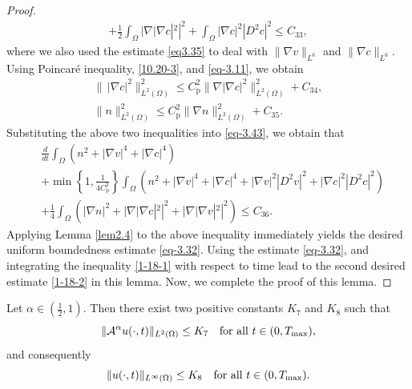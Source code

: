 \documentclass[reqno]{amsart}
\begin{document}
\begin{proof}
\begin{equation}
\begin{aligned}
+ \frac{1}{2}\int_{\Omega} |\nabla |\nabla c|^2|^2
+ \int_{\Omega} |\nabla c|^2 |D^2 c|^2 \leq C_{33},
\end{aligned}
\end{equation}
where we also used the estimate \eqref{eq3.35} to deal with $\|\nabla v\|_{L^6}$ and 
$\|\nabla c\|_{L^6}$.
Using Poincar\'e inequality, \eqref{10.20-3}, and \eqref{eq-3.11}, we obtain
\begin{gather*}
\|\, |\nabla c|^2 \|_{L^2(\Omega)}^2 
\leq C^2_\mathrm{p} \| \nabla|\nabla c|^2 \|_{L^2(\Omega)}^2 +C_{34}, \\
\| n \|_{L^2(\Omega)}^2 \leq C^2_\mathrm{p} \| \nabla n \|_{L^2(\Omega)}^2 +C_{35}.
\end{gather*}
Substituting the above two inequalities into \eqref{eq-3.43}, we obtain that
\begin{equation}\label{1-18-1}
\begin{aligned}
&\frac{d}{dt} \int_{\Omega} \left( n^2 + |\nabla v|^4 + |\nabla c|^4\right)
\\
&+ \min\left\{1,\frac{1}{4C^2_\mathrm{p}} \right\} \int_{\Omega} \left( n^2
 + |\nabla v|^4 + |\nabla c|^4 + |\nabla v|^2 |D^2 v|^2
 + |\nabla c|^2 |D^2 c|^2\right)\\
&+\frac{1}{4}\int_{\Omega}\left(|\nabla n|^2+|\nabla |\nabla c|^2|^2
 +|\nabla |\nabla v|^2|^2\right)\leq C_{36}.
\end{aligned}
\end{equation}
Applying Lemma \ref{lem2.4} to the above inequality immediately yields the desired 
uniform boundedness estimate \eqref{eq-3.32}.
Using the estimate \eqref{eq-3.32}, and  integrating the inequality \eqref{1-18-1} 
with respect to time  lead to the second desired estimate \eqref{1-18-2} in this lemma.
Now, we complete the proof of this lemma.
\end{proof}

\begin{lemma}\label{lem3.7}
Let $ \alpha \in (\frac{1}{2}, 1) $. Then there exist two positive constants $K_7$ 
and $K_8$ such that
\begin{equation}\label{3.60}
\|\mathcal{A}^\alpha u(\cdot, t) \|_{L^2(\Omega)} \leq K_7 \quad 
\text{for all } t \in (0, T_{\rm max}),
\end{equation}
and consequently
\begin{equation}\label{3.61}
\| u(\cdot, t) \|_{L^\infty(\Omega)} \leq K_8 \quad 
\text{for all } t \in (0, T_{\rm max}).
\end{equation}
\end{lemma}
\end{document}
